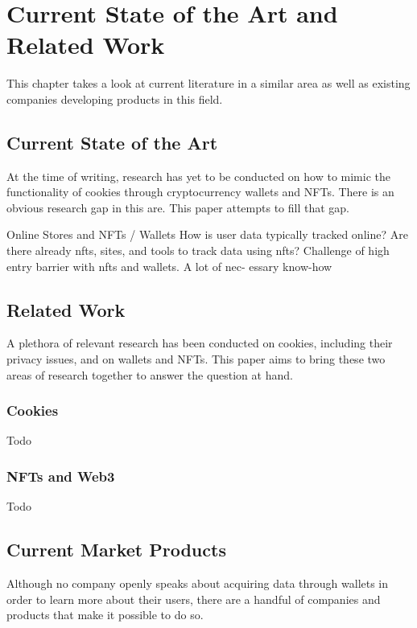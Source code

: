 \chapter{Current State of the Art and Related Work}
\label{ch:SOTA}
This chapter takes a look at current literature in a similar area as well as existing companies developing products in this field.

%
%
\section{Current State of the Art}
\label{sec:sota:stateOfTheArt}
At the time of writing, research has yet to be conducted on how to mimic the functionality of cookies through cryptocurrency wallets and NFTs. There is an obvious research gap in this are. This paper attempts to fill that gap. 

Online Stores and NFTs / Wallets
How is user data typically tracked online? 
Are there already nfts, sites, and tools to track data using nfts? 
Challenge of high entry barrier with nfts and wallets. A lot of nec- essary know-how 


%
%
\section{Related Work}
\label{sec:sota:relatedWork}
A plethora of relevant research has been conducted on cookies, including their privacy issues, and on wallets and NFTs. This paper aims to bring these two areas of research together to answer the question at hand.

\subsection{Cookies}
\label{sec:sota:cookies}
Todo

\subsection{NFTs and Web3}
\label{sec:sota:nfts}
Todo



%
%
\section{Current Market Products}
\label{sec:sota:products}
Although no company openly speaks about acquiring data through wallets in order to learn more about their users, there are a handful of companies and products that make it possible to do so.

